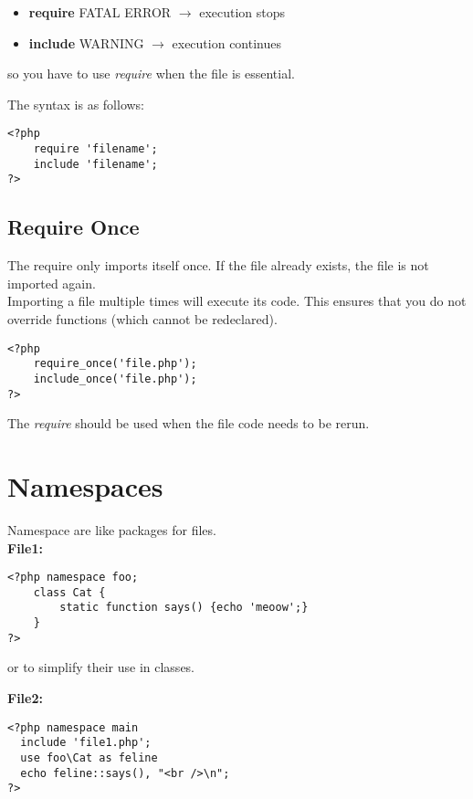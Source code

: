 \documentclass[a4paper]{article}
\begin{document}
\begin{itemize}
    \item \textbf{require} FATAL ERROR \(\rightarrow\) execution stops 
    \item \textbf{include} WARNING \(\rightarrow\) execution continues
\end{itemize}

so you have to use \textit{require} when the file is essential.

The syntax is as follows: 

\begin{lstlisting}
<?php
    require 'filename';
    include 'filename';
?>
\end{lstlisting}

\subsection{Require Once}

The require only imports itself once.
If the file already exists, the file is not imported again.
\\
Importing a file multiple times will execute its code.
This ensures that you do not override functions (which cannot be redeclared).

\begin{lstlisting}
<?php
    require_once('file.php');
    include_once('file.php');
?>
\end{lstlisting}

The \textit{require} should be used when the file code needs to be rerun.

\section{Namespaces}

Namespace are like packages for files. \\

\textbf{File1:}
\begin{lstlisting}
<?php namespace foo;
    class Cat {
        static function says() {echo 'meoow';} 
    }
?>
\end{lstlisting}

or to simplify their use in classes.

\textbf{File2:}
\begin{lstlisting}
<?php namespace main
  include 'file1.php';
  use foo\Cat as feline
  echo feline::says(), "<br />\n";
?>
\end{lstlisting}
\end{document}
